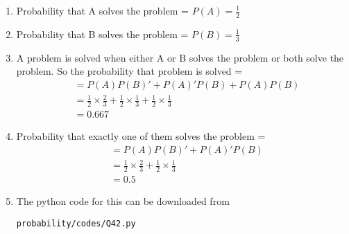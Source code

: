 \renewcommand{\theequation}{\theenumi}
\begin{enumerate}[label=\thesection.\arabic*.,ref=\thesection.\theenumi]
\item Probability that A solves the problem = $P(A) = \frac{1}{2}$
\item Probability that B solves the problem = $P(B) = \frac{1}{3}$
\item A problem is solved when either A or B solves the problem or both solve the problem. So the probability that problem is solved = 
\begin{align}
&= P(A)P(B)' + P(A)'P(B) + P(A)P(B)\\
&= \frac{1}{2}\times\frac{2}{3} + \frac{1}{2}\times\frac{1}{3} + \frac{1}{2}\times\frac{1}{3}\\
&=0.667
\end{align}
\item Probability that exactly one of them solves the problem = 
\begin{align}
&= P(A)P(B)' + P(A)'P(B) \\
&= \frac{1}{2}\times\frac{2}{3} + \frac{1}{2}\times\frac{1}{3} \\
&= 0.5
\end{align}
\item The python code for this can be downloaded from
\begin{lstlisting}
probability/codes/Q42.py
\end{lstlisting}

\end{enumerate}